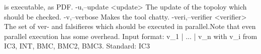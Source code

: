                                         is executable, as PDF.
 -u,--update <update>                    The update of the topoloy which
                                         should be checked.
 -v,--verbose                            Makes the tool chatty.
 -veri,--verifier <verifier>             The set of ver- and falsifieres
                                         which should be executed in
                                         parallel.Note that even parallel
                                         execution has some overhead.
                                         Input format: v_1 | ... | v_n
                                         with v_i from {IC3, INT, BMC,
                                         BMC2, BMC3}. Standard: IC3

